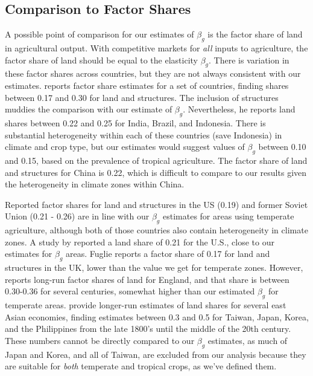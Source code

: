 \documentclass[11pt]{article}
\begin{document}
\subsection{Comparison to Factor Shares}
A possible point of comparison for our estimates of $\beta_g$ is the factor share of land in agricultural output. With competitive markets for \textit{all} inputs to agriculture, the factor share of land should be equal to the elasticity $\beta_g$. There is variation in these factor shares across countries, but they are not always consistent with our estimates. \citet{fuglie2010} reports factor share estimates for a set of countries, finding shares between 0.17 and 0.30 for land and structures. The inclusion of structures muddies the comparison with our estimate of $\beta_g$. Nevertheless, he reports land shares between 0.22 and 0.25 for India, Brazil, and Indonesia. There is substantial heterogeneity within each of these countries (save Indonesia) in climate and crop type, but our estimates would suggest values of $\beta_g$ between 0.10 and 0.15, based on the prevalence of tropical agriculture. The factor share of land and structures for China is 0.22, which is difficult to compare to our results given the heterogeneity in climate zones within China.

Reported factor shares for land and structures in the US (0.19) and former Soviet Union (0.21 - 0.26) are in line with our $\beta_g$ estimates for areas using temperate agriculture, although both of those countries also contain heterogeneity in climate zones. A study by \citet{jg1992} reported a land share of 0.21 for the U.S., close to our estimates for $\beta_g$ areas. Fuglie reports a factor share of 0.17 for land and structures in the UK, lower than the value we get for temperate zones. However, \citet{Clark2002} reports long-run factor shares of land for England, and that share is between 0.30-0.36 for several centuries, somewhat higher than our estimated $\beta_g$ for temperate areas. \citet{hrs1979} provide longer-run estimates of land shares for several east Asian economies, finding estimates between 0.3 and 0.5 for Taiwan, Japan, Korea, and the Philippines from the late 1800's until the middle of the 20th century. These numbers cannot be directly compared to our $\beta_g$ estimates, as much of Japan and Korea, and all of Taiwan, are excluded from our analysis because they are suitable for \textit{both} temperate and tropical crops, as we've defined them. 
\end{document}
